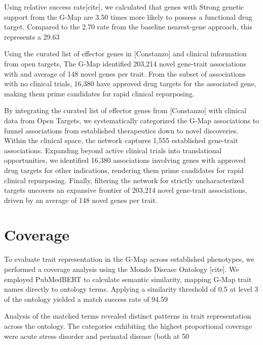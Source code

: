 Using relative success rate[cite], we calculated that genes with Strong genetic support from the G-Map are 3.50 times more likely to possess a functional drug target. Compared to the 2.70 rate from the baseline nearest-gene approach, this represents a 29.63%

Using the curated list of effector genes in [Constanzo] and clinical information from open targets, The G-Map identified 203,214 novel gene-trait associations with and average of 148 novel genes per trait. From the subset of associations with no clinical trials, 16,380 have approved drug targets for the associated gene, making them prime candidates for rapid clinical repurposing.

By integrating the curated list of effector genes from [Constanzo] with clinical data from Open Targets, we systematically categorized the G-Map associations to funnel associations from established therapeutics down to novel discoveries. Within the clinical space, the network captures 1,555 established gene-trait associations. Expanding beyond active clinical trials into translational opportunities, we identified 16,380 associations involving genes with approved drug targets for other indications, rendering them prime candidates for rapid clinical repurposing. Finally, filtering the network for strictly uncharacterized targets uncovers an expansive frontier of 203,214 novel gene-trait associations, driven by an average of 148 novel genes per trait.
\section{Coverage}
\label{sec:coverage}
To evaluate trait representation in the G-Map across established phenotypes, we performed a coverage analysis using the Mondo Disease Ontology [cite]. We employed PubMedBERT to calculate semantic similarity, mapping G-Map trait names directly to ontology terms. Applying a similarity threshold of 0.5 at level 3 of the ontology yielded a match success rate of 94.59%

Analysis of the matched terms revealed distinct patterns in trait representation across the ontology. The categories exhibiting the highest proportional coverage were acute stress disorder and perinatal disease (both at 50%

